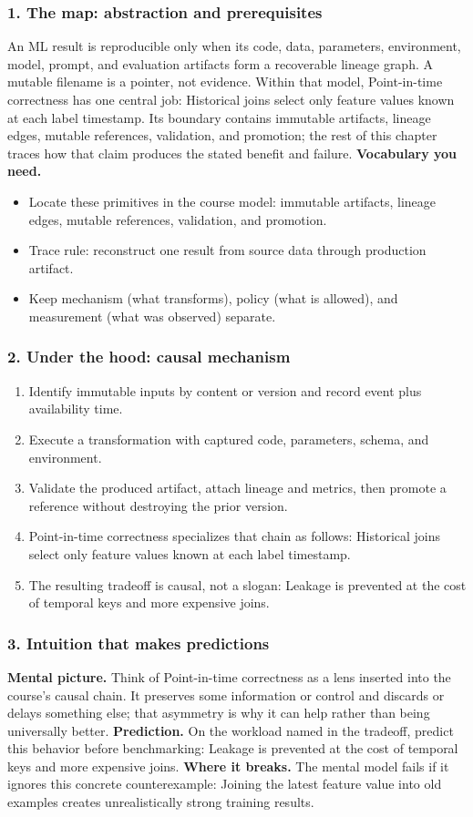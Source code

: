 \subsubsection*{1. The map: abstraction and prerequisites}
An ML result is reproducible only when its code, data, parameters, environment, model, prompt, and evaluation artifacts form a recoverable lineage graph. A mutable filename is a pointer, not evidence.
Within that model, Point-in-time correctness has one central job: Historical joins select only feature values known at each label timestamp. Its boundary contains immutable artifacts, lineage edges, mutable references, validation, and promotion; the rest of this chapter traces how that claim produces the stated benefit and failure.
\textbf{Vocabulary you need.}\begin{itemize}
\item Locate these primitives in the course model: immutable artifacts, lineage edges, mutable references, validation, and promotion.
\item Trace rule: reconstruct one result from source data through production artifact.
\item Keep mechanism (what transforms), policy (what is allowed), and measurement (what was observed) separate.
\end{itemize}
\subsubsection*{2. Under the hood: causal mechanism}\begin{enumerate}
\item Identify immutable inputs by content or version and record event plus availability time.
\item Execute a transformation with captured code, parameters, schema, and environment.
\item Validate the produced artifact, attach lineage and metrics, then promote a reference without destroying the prior version.
\item Point-in-time correctness specializes that chain as follows: Historical joins select only feature values known at each label timestamp.
\item The resulting tradeoff is causal, not a slogan: Leakage is prevented at the cost of temporal keys and more expensive joins.
\end{enumerate}
\subsubsection*{3. Intuition that makes predictions}
\textbf{Mental picture.} Think of Point-in-time correctness as a lens inserted into the course's causal chain. It preserves some information or control and discards or delays something else; that asymmetry is why it can help rather than being universally better.
\textbf{Prediction.} On the workload named in the tradeoff, predict this behavior before benchmarking: Leakage is prevented at the cost of temporal keys and more expensive joins.
\textbf{Where it breaks.} The mental model fails if it ignores this concrete counterexample: Joining the latest feature value into old examples creates unrealistically strong training results.
